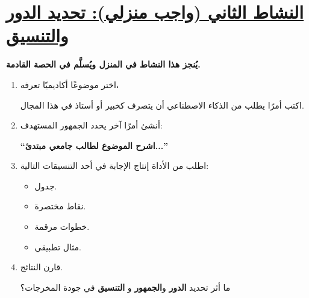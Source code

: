 \documentclass[a4paper]{article}
\begin{document}

\section*{\khatt\underline{النشاط الثاني (واجب منزلي): تحديد الدور والتنسيق}}

\textbf{يُنجز هذا النشاط في المنزل ويُسلَّم في الحصة القادمة.}

\begin{enumerate}

\item اختر موضوعًا أكاديميًا تعرفه،

اكتب أمرًا يطلب من الذكاء الاصطناعي أن يتصرف كخبير
أو أستاذ في هذا المجال.


\item أنشئ أمرًا آخر يحدد الجمهور المستهدف:

\begin{center}

\textbf{
``اشرح الموضوع لطالب جامعي مبتدئ...''
}

\end{center}


\item اطلب من الأداة إنتاج الإجابة في أحد التنسيقات التالية:

\begin{itemize}

    \item جدول.
    \item نقاط مختصرة.
    \item خطوات مرقمة.
    \item مثال تطبيقي.

\end{itemize}


\item قارن النتائج.

ما أثر تحديد \textbf{الدور} و\textbf{الجمهور} و
\textbf{التنسيق} في جودة المخرجات؟

\end{enumerate}
\end{document}
